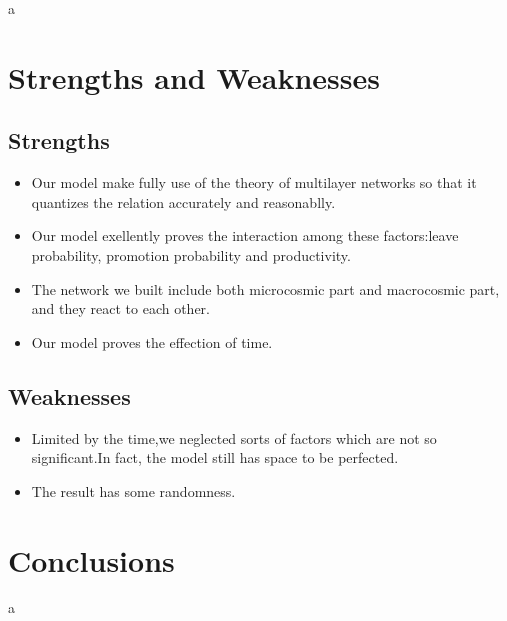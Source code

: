 \documentclass[12pt,a4paper,titlepage]{article}
\begin{document}
a

\section{Strengths and Weaknesses}
\label{sec:strengths-and-weaknesses}

\subsection*{Strengths}
\label{sec:strengths}

\begin{itemize}
\item Our model make fully use of the theory of multilayer networks so
  that it quantizes the relation accurately and reasonablly.
\item Our model exellently proves the interaction among these
  factors:leave probability, promotion probability and productivity.
\item The network we built include both microcosmic part and
  macrocosmic part, and they react to each other.
\item Our model proves the effection of time.
\end{itemize}

\subsection*{Weaknesses}
\label{sec:weaknesses}

\begin{itemize}
\item Limited by the time,we neglected sorts of factors which are not so significant.In fact, the model still has space to be perfected.
\item The result has some randomness.
\end{itemize}

\section{Conclusions}
\label{sec:conclusions}

a
\end{document}
